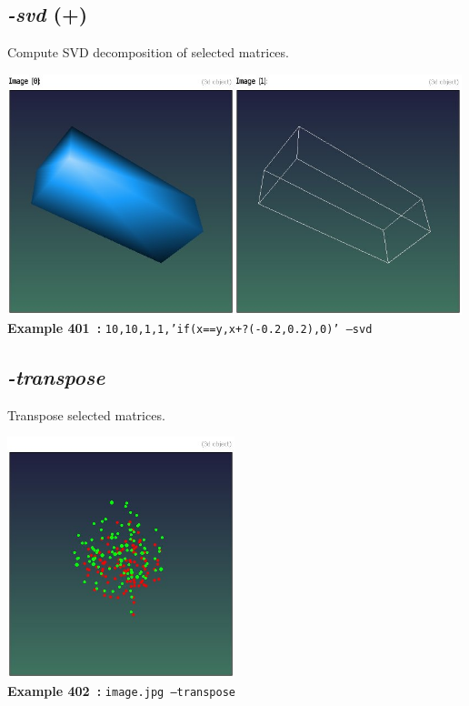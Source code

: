 \documentclass[a4paper,11pt,twoside]{book}
\begin{document}
\subsection{\emph{-svd} (+)}\vspace*{-0.5em}
Compute SVD decomposition of selected matrices.
\begin{center}\includegraphics[keepaspectratio=true,height=7cm,width=\textwidth]{img/gmic_def401.jpg}\\
{\footnotesize \textbf{Example 401~:} \texttt{10,10,1,1,'if(x==y,x+?(-0.2,0.2),0)' --svd}}
\end{center}

\subsection{\emph{-transpose} }\vspace*{-0.5em}
Transpose selected matrices.
\begin{center}\includegraphics[keepaspectratio=true,height=7cm,width=\textwidth]{img/gmic_def402.jpg}\\
{\footnotesize \textbf{Example 402~:} \texttt{image.jpg --transpose}}
\end{center}
\end{document}
